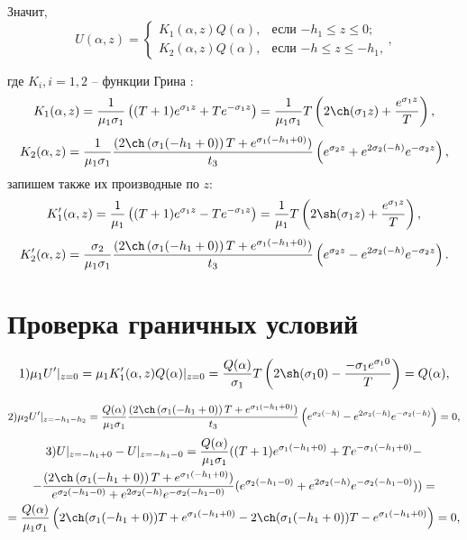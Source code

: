 \documentclass[a4paper, 12pt]{article}
\newcommand{\s}[1]{\sigma_{#1}}
\newcommand{\m}[1]{\mu_{#1}}
\newcommand{\E}[2]{e^{#1 #2}}
\begin{document}
Значит,
    \[
U(\alpha,z) =
\begin{cases}
K_1(\alpha,z)Q(\alpha), & \text{если $-h_1\leq z \leq0$;} \\
K_2(\alpha,z)Q(\alpha), & \text{если $-h\leq z \leq-h_1$,}
\end{cases},
\]

где $K_i, i=1, 2$ -- функции Грина \cite{g89, new}:
$$K_1(\alpha,z)=\frac{1}{\m{1}\s{1}}\left((T+1)\E{\s{1}}{z}+T\E{-\s{1}}{z} \right)=\frac{1}{\m{1}\s{1}}T \left(2 \ch (\s{1}z) +\frac{\E{\s{1}}{z}}{T}\right),$$
$$K_2(\alpha,z)=\frac{1}{\m{1} \s{1}}\frac{(2\ch \left(\s{1}(-h_1+0) \right)T+\E{\s{1}}{(-h_1+0)})}{t_3}\left(\E{\s{2}}{z}+ \E{2\s{2}}{(-h)} \E{-\s{2}}{z} \right),$$
запишем также их производные по $z$:
$$K_1'(\alpha,z)=\frac{1}{\m{1}}\left((T+1)\E{\s{1}}{z}-T\E{-\s{1}}{z} \right)=\frac{1}{\m{1}}T \left(2 \sh (\s{1}z) +\frac{\E{\s{1}}{z}}{T}\right),$$
$$K_2'(\alpha,z)=\frac{\s{2}}{\m{1} \s{1}}\frac{(2\ch \left(\s{1}(-h_1+0) \right)T+\E{\s{1}}{(-h_1+0)})}{t_3}\left(\E{\s{2}}{z}- \E{2\s{2}}{(-h)} \E{-\s{2}}{z} \right).$$

\section{Проверка граничных условий}

$$1) \m{1}U'|_{z=0}=\m{1}K_1'(\alpha,z)Q(\alpha)|_{z=0}=\frac{Q(\alpha)}{\s{1}}T \left(2 \sh (\s{1}0) -\frac{-\s{1}\E{\s{1}}{0}}{T}\right)=Q(\alpha),$$

$$2)\m{2}U'|_{z=-h_1-h_2}=\frac{Q(\alpha)}{\m{1} \s{1}}\frac{(2\ch \left(\s{1}(-h_1+0) \right)T+\E{\s{1}}{(-h_1+0)})}{t_3}\left(\E{\s{2}}{(-h)}- \E{2\s{2}}{(-h)} \E{-\s{2}}{(-h)} \right)=0,$$
\begin{multline}
    3)U|_{z=-h_1+0}-U|_{z=-h_1-0}=\frac{Q(\alpha)}{\m{1} \s{1}} ((T+1)\E{\s{1}}{(-h_1+0)}+T\E{-\s{1}}{(-h_1+0)}-\\
    -\frac{(2\ch \left (\s{1}(-h_1+0) \right)T+\E{\s{1}}{(-h_1+0)})}{\E{\s{2}}{(-h_1-0)}+ \E{2\s{2}}{(-h)} \E{-\s{2}}{(-h_1-0)}}(\E{\s{2}}{(-h_1-0)}+ \E{2\s{2}}{(-h)} \E{-\s{2}}{(-h_1-0)}) )=\\
    =\frac{Q(\alpha)}{\m{1} \s{1}} \left(2 \ch (\s{1}(-h_1+0))T +\E{\s{1}}{(-h_1+0)} - 2 \ch (\s{1}(-h_1+0))T-\E{\s{1}}{(-h_1+0)}\right)=0,
\end{multline}
\end{document}
